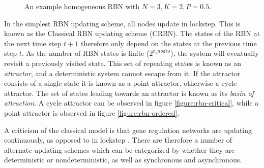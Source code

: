 \begin{figure}
  \centering
  \caption[An example homogeneous RBN]{An example homogeneous RBN with $N=3, K=2, P=0.5$.}
  \label{figure:sample-homogenous-rbn}
\end{figure}

In the simplest RBN updating scheme, all nodes update in lockstep.
This is known as the Classical RBN updating scheme (CRBN).
The states of the RBN at the next time step $t+1$ therefore only depend on the states at the previous time step $t$.
As the number of RBN states is finite ($2^{n\_nodes}$),
the system will eventually revisit a previously visited state.
This set of repeating states is known as an \emph{attractor},
and a deterministic system cannot escape from it.
If the attractor consists of a single state it is known as a point attractor,
otherwise a cycle attractor.
The set of states leading towards an attractor is known as its \emph{basin of attraction}.
A cycle attractor can be observed in figure \ref{figure:rbn-critical},
while a point attractor is observed in figure \ref{figure:rbn-ordered}.

A criticism of the classical model is that gene regulation networks are updating continuously,
as opposed to in lockstep \cite{gershenson2004introduction}.
There are therefore a number of alternate updating schemes which can be categorized by whether they are deterministic or nondeterministic, as well as synchronous and asynchronous.

